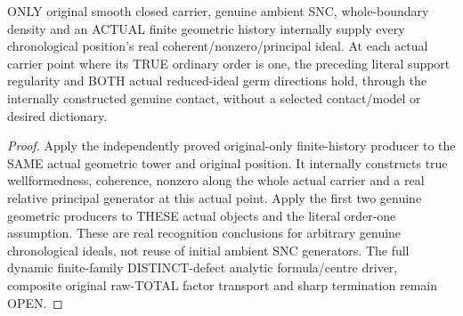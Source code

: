 \begin{theorem}
\label{hir:sharp-original-chronological-order-one-actual-reduced-trace}
\leanok
ONLY original smooth closed carrier, genuine ambient SNC, whole-boundary
density and an ACTUAL finite geometric history internally supply every
chronological position's real coherent/nonzero/principal ideal. At each
actual carrier point where its TRUE ordinary order is one, the preceding
literal support regularity and BOTH actual reduced-ideal germ
directions hold, through the internally constructed genuine contact, without a selected contact/model or desired dictionary.
\end{theorem}
\begin{proof}
Apply the independently proved original-only finite-history producer to the
SAME actual geometric tower and original position. It internally constructs
true wellformedness, coherence, nonzero along the whole actual carrier and
a real relative principal generator at this actual point. Apply the first
two genuine geometric producers to THESE actual objects and the literal
order-one assumption. These are real recognition conclusions for arbitrary
genuine chronological ideals, not reuse of initial ambient SNC generators.
The full dynamic finite-family DISTINCT-defect analytic formula/centre driver,
composite original raw-TOTAL factor transport and sharp termination remain OPEN.
\end{proof}

